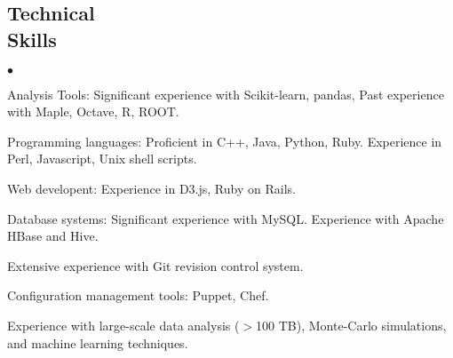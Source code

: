 \documentclass[margin,line]{res}
\newenvironment{list2}{
  \begin{list}{$\bullet$}{%
      \setlength{\itemsep}{0in}
      \setlength{\parsep}{0in} \setlength{\parskip}{0in}
      \setlength{\topsep}{0in} \setlength{\partopsep}{0in}
      \setlength{\leftmargin}{0.2in}}}{\end{list}}
\begin{document}
\begin{resume}
\section{\sc Technical \\ Skills}
\begin{list2}
\item Analysis Tools: Significant experience with Scikit-learn,
  pandas,  Past experience with Maple, Octave, R, ROOT. %
\item Programming languages: Proficient in C++, Java, Python, Ruby.
  Experience in Perl, Javascript, Unix shell scripts.
\item Web developent: Experience in D3.js, Ruby on Rails.
\item Database systems: Significant experience with MySQL. Experience with Apache HBase and Hive.
\item Extensive experience with Git revision control system.
\item Configuration management tools: Puppet, Chef.
\item Experience with large-scale data analysis ($>$100 TB), Monte-Carlo simulations,
and machine learning techniques.
\end{list2}




\end{resume}
\end{document}
